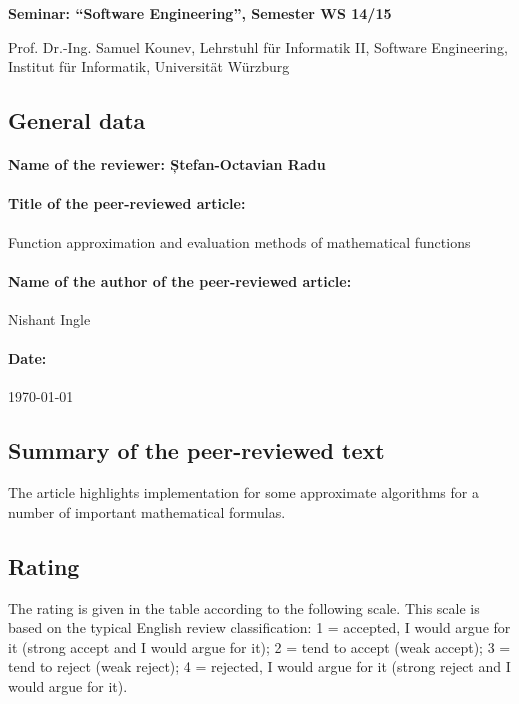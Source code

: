 \documentclass[12pt]{scrartcl}
\begin{document}
\begin{center}
\textbf{Seminar: "`Software Engineering"', Semester WS 14/15}

Prof. Dr.-Ing. Samuel Kounev, Lehrstuhl für Informatik II, Software Engineering, Institut für Informatik, Universität Würzburg
\end{center}


\subsection*{General data}

\paragraph{Name of the reviewer: Ștefan-Octavian Radu}

\paragraph{Title of the peer-reviewed article:} Function approximation and evaluation methods of mathematical functions

\paragraph{Name of the author of the peer-reviewed article:} Nishant Ingle

\paragraph{Date:} \today

\subsection*{Summary of the peer-reviewed text} The article highlights
implementation for some approximate algorithms for a number of important
mathematical formulas.


\subsection*{Rating}
The rating is given in the table according to the following scale. This scale is based on the typical English review classification: 1 = accepted, I would argue for it (strong accept and I would argue for it); 2 = tend to accept (weak accept); 3 = tend to reject (weak reject); 4 = rejected, I would argue for it (strong reject and I would argue for it).
\end{document}
